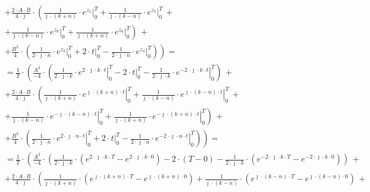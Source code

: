 \begin{task}
\begin{align*}
&+ \left. \frac{2 \cdot A\cdot B}{4 \cdot \jmath} \cdot \left( \frac{1}{\jmath \cdot \left(k+n\right)} \cdot \left. e^{z_5}\right|_{0}^{T} + \frac{1}{\jmath \cdot \left(k-n\right) } \cdot \left. e^{z_7}\right|_{0}^{T} \,+\right.\right.\\
&+ \left.\left.  \frac{1}{\jmath \cdot \left(k-n\right)} \cdot \left. e^{z_8}\right|_{0}^{T} + \frac{1}{\jmath \cdot \left(k+n\right) } \cdot \left. e^{z_6} \right|_{0}^{T} \right)\,+\right.\\
&+ \left. \frac{B^2}{4} \cdot \left( \frac{1}{2\cdot \jmath \cdot n} \cdot \left. e^{z_3}\right|_{0}^{T}+2\cdot \left. t\right|_{0}^{T} - \frac{1}{2\cdot \jmath \cdot n}\cdot \left. e^{z_4} \right|_{0}^{T} \right) \right)=\\
&=\frac{1}{T} \cdot \left( \frac{A^2}{-4}\cdot \left( \frac{1}{2\cdot \jmath \cdot k} \cdot \left. e^{2\cdot \jmath \cdot k \cdot t} \right|_{0}^{T} -2 \cdot \left. t\right|_{0}^{T} - \frac{1}{2\cdot \jmath \cdot k}\cdot \left. e^{-2\cdot \jmath \cdot k \cdot t} \right|_{0}^{T} \right) \,+\right. \\
&+ \left. \frac{2 \cdot A\cdot B}{4 \cdot \jmath} \cdot \left( \frac{1}{\jmath \cdot \left(k+n\right)} \cdot \left. e^{\jmath \cdot \left(k+n\right) \cdot t}\right|_{0}^{T} + \frac{1}{\jmath \cdot \left(k-n\right) } \cdot \left. e^{\jmath \cdot \left(k-n\right) \cdot t}\right|_{0}^{T} \,+\right.\right.\\
&+ \left.\left.  \frac{1}{\jmath \cdot \left(k-n\right)} \cdot \left. e^{-\jmath \cdot \left(k-n\right) \cdot t}\right|_{0}^{T} + \frac{1}{\jmath \cdot \left(k+n\right) } \cdot \left. e^{-\jmath \cdot \left(k+n\right) \cdot t} \right|_{0}^{T} \right)\,+\right.\\
&+ \left. \frac{B^2}{4} \cdot \left( \frac{1}{2\cdot \jmath \cdot n} \cdot \left. e^{2\cdot \jmath \cdot n \cdot t}\right|_{0}^{T}+2\cdot \left. t\right|_{0}^{T} - \frac{1}{2\cdot \jmath \cdot n}\cdot \left. e^{-2\cdot \jmath \cdot n \cdot t} \right|_{0}^{T} \right) \right)=\\
&=\frac{1}{T} \cdot \left( \frac{A^2}{-4}\cdot \left( \frac{1}{2\cdot \jmath \cdot k} \cdot \left( e^{2\cdot \jmath \cdot k \cdot T} -  e^{2\cdot \jmath \cdot k \cdot 0} \right) -2 \cdot \left(T - 0\right) - \frac{1}{2\cdot \jmath \cdot k}\cdot \left(e^{-2\cdot \jmath \cdot k \cdot T} - e^{-2\cdot \jmath \cdot k \cdot 0} \right) \right) \,+\right. \\
&+ \left. \frac{2 \cdot A\cdot B}{4 \cdot \jmath} \cdot \left( \frac{1}{\jmath \cdot \left(k+n\right)} \cdot \left( e^{\jmath \cdot \left(k+n\right) \cdot T}-e^{\jmath \cdot \left(k+n\right) \cdot 0}\right) + \frac{1}{\jmath \cdot \left(k-n\right) } \cdot \left( e^{\jmath \cdot \left(k-n\right) \cdot T} - e^{\jmath \cdot \left(k-n\right) \cdot 0}\right) \,+\right.\right.\\

\end{align*}
\end{task}
